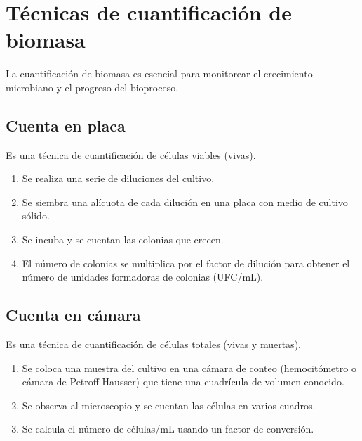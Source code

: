 


\section{Técnicas de cuantificación de biomasa}

La cuantificación de biomasa es esencial para monitorear el crecimiento microbiano y el progreso del bioproceso.

\subsection{Cuenta en placa}
Es una técnica de cuantificación de células viables (vivas).
\begin{enumerate}
    \item Se realiza una serie de diluciones del cultivo.
    \item Se siembra una alícuota de cada dilución en una placa con medio de cultivo sólido.
    \item Se incuba y se cuentan las colonias que crecen.
    \item El número de colonias se multiplica por el factor de dilución para obtener el número de unidades formadoras de colonias (UFC/mL).
\end{enumerate}

\subsection{Cuenta en cámara}
Es una técnica de cuantificación de células totales (vivas y muertas).
\begin{enumerate}
    \item Se coloca una muestra del cultivo en una cámara de conteo (hemocitómetro o cámara de Petroff-Hausser) que tiene una cuadrícula de volumen conocido.
    \item Se observa al microscopio y se cuentan las células en varios cuadros.
    \item Se calcula el número de células/mL usando un factor de conversión.
\end{enumerate}

